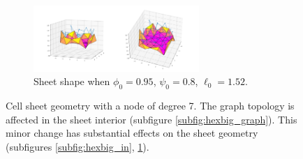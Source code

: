 \begin{figure}[htbp]
\begin{subfigure}[b]{\textwidth}
        \includegraphics[width=0.69\textwidth]{hexbig/hexbig0.95_0.8_1.35_10_plot.png}
        \caption{Sheet shape when $\phi_0=0.95$, $\psi_0=0.8$, $\ell_0=1.52$.}
        \label{subfig:hexbig_out}
    \end{subfigure}
    \caption{Cell sheet geometry with a node of degree 7. The graph topology is affected in the sheet interior (subfigure \ref{subfig:hexbig_graph}). This minor change has substantial effects on the sheet geometry (subfigures \ref{subfig:hexbig_in}, \ref{subfig:hexbig_out}).}
    \label{fig:hexbig}
\end{figure}

